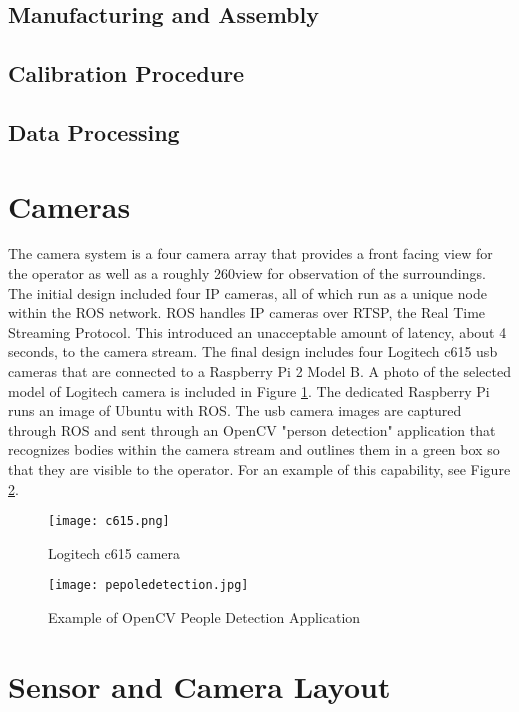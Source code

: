 \subsection{Manufacturing and Assembly}

\subsection{Calibration Procedure}

\subsection{Data Processing}

\section{Cameras}

The camera system is a four camera array that provides a front facing view for the operator as well as a roughly 260\degree  view for observation of the surroundings. The initial design included four IP cameras, all of which run as a unique node within the ROS network. ROS handles IP cameras over RTSP, the Real Time Streaming Protocol. This introduced an unacceptable amount of latency, about 4 seconds, to the camera stream. The final design includes four Logitech c615 usb cameras that are connected to a Raspberry Pi 2 Model B. A photo of the selected model of Logitech camera is included in Figure \ref{fig:logitechcam}. The dedicated Raspberry Pi runs an image of Ubuntu with ROS. The usb camera images are captured through ROS and sent through an OpenCV "person detection" application that recognizes bodies within the camera stream and outlines them in a green box so that they are visible to the operator. For an example of this capability, see Figure \ref{fig:peopledetect}. 

\begin{figure}[H]
	\centering
	\texttt{[image: c615.png]}
	\caption{Logitech c615 camera}
	\label{fig:logitechcam}
\end{figure}
\begin{figure}[H]
	\centering
	\texttt{[image: pepoledetection.jpg]}
	\caption{Example of OpenCV People Detection Application}
	\label{fig:peopledetect}
	\end{figure}

\section{Sensor and Camera Layout}

